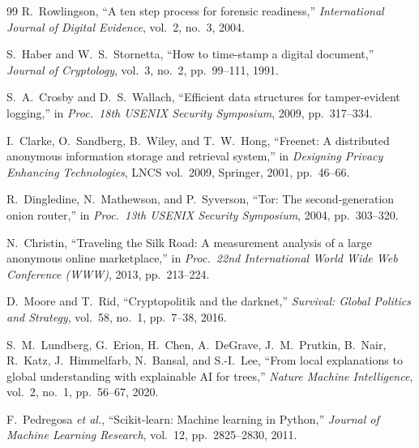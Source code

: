 \documentclass[12pt,a4paper,oneside]{article}
\begin{document}
\begin{thebibliography}{99}
 R.~Rowlingson, ``A ten step process for forensic readiness,'' \emph{International Journal of Digital Evidence}, vol.~2, no.~3, 2004.

 S.~Haber and W.~S.~Stornetta, ``How to time-stamp a digital document,'' \emph{Journal of Cryptology}, vol.~3, no.~2, pp.\ 99--111, 1991.

 S.~A.~Crosby and D.~S.~Wallach, ``Efficient data structures for tamper-evident logging,'' in \emph{Proc.\ 18th USENIX Security Symposium}, 2009, pp.\ 317--334.

 I.~Clarke, O.~Sandberg, B.~Wiley, and T.~W.~Hong, ``Freenet: A distributed anonymous information storage and retrieval system,'' in \emph{Designing Privacy Enhancing Technologies}, LNCS vol.~2009, Springer, 2001, pp.\ 46--66.

 R.~Dingledine, N.~Mathewson, and P.~Syverson, ``Tor: The second-generation onion router,'' in \emph{Proc.\ 13th USENIX Security Symposium}, 2004, pp.\ 303--320.

 N.~Christin, ``Traveling the Silk Road: A measurement analysis of a large anonymous online marketplace,'' in \emph{Proc.\ 22nd International World Wide Web Conference (WWW)}, 2013, pp.\ 213--224.

 D.~Moore and T.~Rid, ``Cryptopolitik and the darknet,'' \emph{Survival: Global Politics and Strategy}, vol.~58, no.~1, pp.\ 7--38, 2016.

 S.~M.~Lundberg, G.~Erion, H.~Chen, A.~DeGrave, J.~M.~Prutkin, B.~Nair, R.~Katz, J.~Himmelfarb, N.~Bansal, and S.-I.~Lee, ``From local explanations to global understanding with explainable AI for trees,'' \emph{Nature Machine Intelligence}, vol.~2, no.~1, pp.\ 56--67, 2020.

 F.~Pedregosa \emph{et al.}, ``Scikit-learn: Machine learning in Python,'' \emph{Journal of Machine Learning Research}, vol.~12, pp.\ 2825--2830, 2011.

\end{thebibliography}
\endgroup
\end{document}
